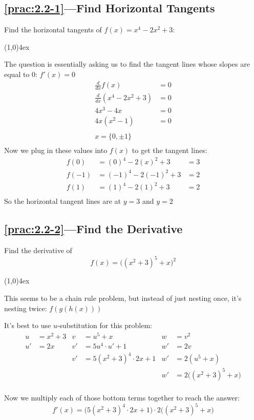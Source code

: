 \documentclass{MathNotes}
\newcommand{\br}{
	\begin{center}
		\line(1,0){4ex}
	\end{center}}
\begin{document}
\newpage
\subsection*{\ref{prac:2.2-1}---Find Horizontal Tangents}\label{ans:2.2-1}
Find the horizontal tangents of $f(x)=x^4-2x^2+3$:
\br
The question is essentially asking us to find the tangent lines whose
slopes are equal to 0: $f'(x)=0$
\begin{align*}
	\frac{d}{dx}f(x)         & =0 \\
	\frac{d}{dx}(x^4-2x^2+3) & =0 \\
	4x^3-4x                  & =0 \\
	4x(x^2-1)                & =0 \\
	\\
	x=\{0, \pm 1\}                \\
\end{align*}
Now we plug in these values into $f(x)$ to get the tangent lines:
\begin{align*}
	f(0)  & =(0)^4-2(x)^2+3   & =3 \\
	f(-1) & =(-1)^4-2(-1)^2+3 & =2 \\
	f(1)  & =(1)^4-2(1)^2+3   & =2 \\
\end{align*}
So the horizontal tangent lines are at $y=3$ and $y=2$

\subsection*{\ref{prac:2.2-2}---Find the Derivative}\label{ans:2.2-2}
Find the derivative of $$f(x)=\big((x^2+3)^5+x\big)^2$$
\br
This seems to be a chain rule problem, but instead of just nesting once,
it's nesting twice: $f(g(h(x)))$

It's best to use $u$-substitution for this problem:
\begin{align*}
	u  & =x^2+3 & v  & =u^5+x                & w  & =v^2                    \\
	u' & =2x    & v' & =5u^4\cdot u'+1       & w' & =2v                     \\
	   &        & v' & =5(x^2+3)^4\cdot 2x+1 & w' & =2(u^5+x)               \\
	   &        &    &                       & w' & =2\big((x^2+3)^5+x\big) \\
\end{align*}

Now we multiply each of those bottom terms together to reach the answer:
$$f'(x)=\big(5(x^2+3)^4\cdot 2x+1\big)\cdot2\big((x^2+3)^5+x\big)$$
\end{document}

